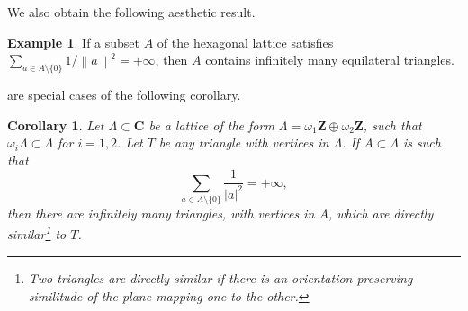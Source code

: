 \documentclass{daj}
\newtheorem{corollary}[theorem]{Corollary}
\theoremstyle{definition}
\newtheorem{example}[theorem]{Example}
\newcommand{\R}{\ensuremath{\mathbf{R}}}
\newcommand{\C}{\ensuremath{\mathbf{C}}}
\newcommand{\Z}{\ensuremath{\mathbf{Z}}}
\newcommand{\norm}[1]{\left\|#1\right\|}
\begin{document}
We also obtain the following aesthetic result.

\begin{example}
\label{ex:EQtriangle}
If a subset $A$ of the hexagonal lattice satisfies $\sum_{a\in A\setminus\{0\}} {1}/{\norm{a}^2} = +\infty$, then  $A$ contains infinitely many equilateral triangles.
\end{example}

 are special cases of the following corollary.


\begin{corollary}
\label{cor:generaltriangles}
Let $\Lambda \subset \C$ be a lattice of the form $\Lambda = \omega_1 \Z \oplus \omega_2 \Z$, such that $\omega_i \Lambda \subset \Lambda$ for $i=1,2$.
Let $T$ be any triangle with vertices in $\Lambda$. If $A \subset \Lambda$ is such that 
\begin{equation*}
\sum_{a\in A\setminus\{0\}} \frac{1}{|a|^2} = +\infty,
\end{equation*}
then there are infinitely many triangles, with vertices in $A$, which are directly similar\footnote{Two triangles are directly similar if there is an orientation-preserving similitude of the plane mapping one to the other.} to $T$.
\end{corollary}
\end{document}
